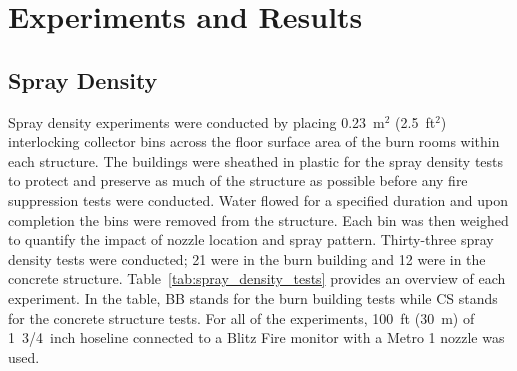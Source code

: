 \documentclass[12pt,oneside]{book}
\begin{document}
\chapter{Experiments and Results}
\label{chap:Experiments_and_Results}

\section{Spray Density}
\label{sec:Spray_Density}

Spray density experiments were conducted by placing 0.23~m$^2$ (2.5~ft$^2$) interlocking collector bins across the floor surface area of the burn rooms within each structure. The buildings were sheathed in plastic for the spray density tests to protect and preserve as much of the structure as possible before any fire suppression tests were conducted. Water flowed for a specified duration and upon completion the bins were removed from the structure. Each bin was then weighed to quantify the impact of nozzle location and spray pattern. Thirty-three spray density tests were conducted; 21 were in the burn building and 12 were in the concrete structure. Table~\ref{tab:spray_density_tests} provides an overview of each experiment. In the table, BB stands for the burn building tests while CS stands for the concrete structure tests. For all of the experiments, 100~ft (30~m) of 1~3/4~inch hoseline connected to a Blitz Fire monitor with a Metro 1 nozzle was used.
\end{document}

